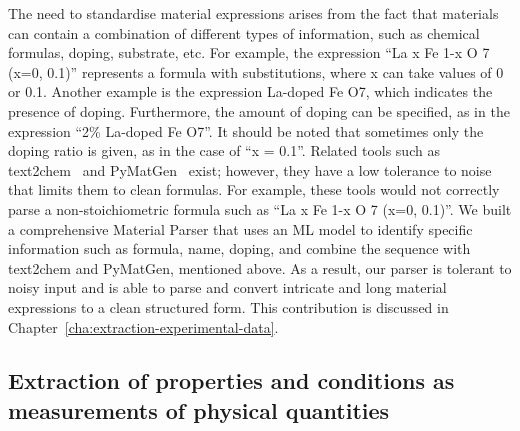 The need to standardise material expressions arises from the fact that materials can contain a combination of different types of information, such as chemical formulas, doping, substrate, etc. For example, the expression ``La x Fe 1-x O 7 (x=0, 0.1)'' represents a formula with substitutions, where x can take values of 0 or 0.1. 
Another example is the expression La-doped Fe O7, which indicates the presence of doping. Furthermore, the amount of doping can be specified, as in the expression ``2\% La-doped Fe O7''. It should be noted that sometimes only the doping ratio is given, as in the case of ``x = 0.1''. 
Related tools such as text2chem~\cite{kononova2019text} and PyMatGen~\cite{Ong2013} exist; however, they have a low tolerance to noise that limits them to clean formulas. 
For example, these tools would not correctly parse a non-stoichiometric formula such as ``La x Fe 1-x O 7 (x=0, 0.1)''. 
We built a comprehensive Material Parser that uses an ML model to identify specific information such as formula, name, doping, and combine the sequence with text2chem and PyMatGen, mentioned above. 
As a result, our parser is tolerant to noisy input and is able to parse and convert intricate and long material expressions to a clean structured form. 
This contribution is discussed in Chapter~\ref{cha:extraction-experimental-data}.


\subsection{Extraction of properties and conditions as measurements of physical quantities}
\label{sec:intro-ner-quantities}

